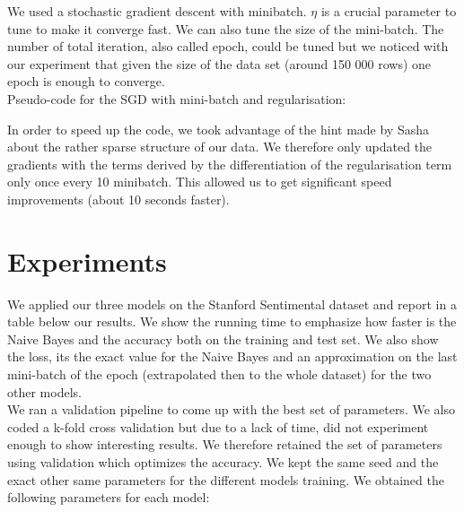 \documentclass[11pt]{article}
\begin{document}
We used a stochastic gradient descent \citep{bottou2012stochastic} with minibatch. $\eta$ is a crucial parameter to tune to make it converge fast. We can also tune the size of the mini-batch. The number of total iteration, also called epoch, could be tuned but we noticed with our experiment that given the size of the data set (around 150 000 rows) one epoch is enough to converge.\\


Pseudo-code for the SGD with mini-batch and regularisation:

  \begin{algorithmic}[1]
    \EndFor{}
    \EndFor{}
    \State{\Return{$\theta$}}
  \end{algorithmic}
  

\noindent In order to speed up the code, we took advantage of the hint made by Sasha about the rather sparse structure of our data. We therefore only updated the gradients with the terms derived by the differentiation of the regularisation term only once every 10 minibatch. This allowed us to get significant speed improvements (about 10 seconds faster).

\section{Experiments}

We applied our three models on the Stanford Sentimental dataset and report in a table below our results. We show the running time to emphasize how faster is the Naive Bayes and the accuracy both on the training and test set. We also show the loss, its the exact value for the Naive Bayes and an approximation on the last mini-batch of the epoch (extrapolated then to the whole dataset) for the two other models.\\

\noindent We ran a validation pipeline to come up with the best set of parameters. We also coded a k-fold cross validation but due to a lack of time, did not experiment enough to show interesting results. We therefore retained the set of parameters using validation which optimizes the accuracy. We kept the same seed and the exact other same parameters for the different models training. We obtained the following parameters for each model:
\end{document}
